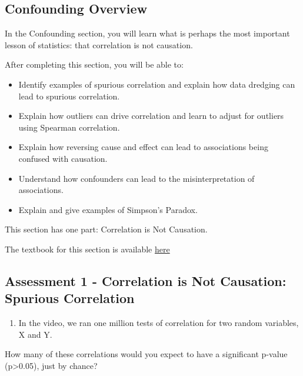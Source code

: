 \documentclass[
]{article}
\providecommand{\tightlist}{%
  \setlength{\itemsep}{0pt}\setlength{\parskip}{0pt}}
\begin{document}
\hypertarget{confounding-overview}{%
\subsection{Confounding Overview}\label{confounding-overview}}

In the Confounding section, you will learn what is perhaps the most
important lesson of statistics: that correlation is not causation.

After completing this section, you will be able to:

\begin{itemize}
\tightlist
\item
  Identify examples of spurious correlation and explain how data
  dredging can lead to spurious correlation.
\item
  Explain how outliers can drive correlation and learn to adjust for
  outliers using Spearman correlation.
\item
  Explain how reversing cause and effect can lead to associations being
  confused with causation.
\item
  Understand how confounders can lead to the misinterpretation of
  associations.
\item
  Explain and give examples of Simpson's Paradox.
\end{itemize}

This section has one part: Correlation is Not Causation.

The textbook for this section is available
\href{https://rafalab.github.io/dsbook/association-is-not-causation.html}{here}

\hypertarget{assessment-1---correlation-is-not-causation-spurious-correlation}{%
\subsection{Assessment 1 - Correlation is Not Causation: Spurious
Correlation}\label{assessment-1---correlation-is-not-causation-spurious-correlation}}

\begin{enumerate}
\def\labelenumi{\arabic{enumi}.}
\tightlist
\item
  In the video, we ran one million tests of correlation for two random
  variables, X and Y.
\end{enumerate}

How many of these correlations would you expect to have a significant
p-value (p\textgreater0.05), just by chance?
\end{document}
